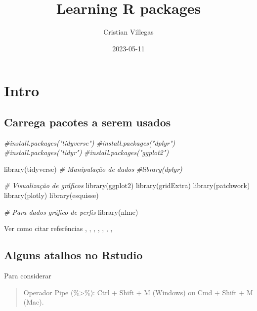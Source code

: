 \documentclass[
]{book}
\title{Learning R packages}
\author{Cristian Villegas}
\date{2023-05-11}
\newenvironment{Shaded}{\begin{snugshade}}{\end{snugshade}}
\newcommand{\CommentTok}[1]{\textcolor[rgb]{0.56,0.35,0.01}{\textit{#1}}}
\newcommand{\FunctionTok}[1]{\textcolor[rgb]{0.00,0.00,0.00}{#1}}
\newcommand{\NormalTok}[1]{#1}
\begin{document}
\maketitle

{
\setcounter{tocdepth}{1}
\tableofcontents
}
\hypertarget{intro}{%
\chapter{Intro}\label{intro}}

\hypertarget{carrega-pacotes-a-serem-usados}{%
\section{Carrega pacotes a serem usados}\label{carrega-pacotes-a-serem-usados}}

\begin{Shaded}
\begin{Highlighting}[]
\CommentTok{\#install.packages("tidyverse") }
\CommentTok{\#install.packages("dplyr")     }
\CommentTok{\#install.packages("tidyr")     }
\CommentTok{\#install.packages("ggplot2")   }

\FunctionTok{library}\NormalTok{(tidyverse)}
\CommentTok{\# Manipulação de dados}
\CommentTok{\#library(dplyr)}

\CommentTok{\# Visualização de gráficos}
\FunctionTok{library}\NormalTok{(ggplot2)}
\FunctionTok{library}\NormalTok{(gridExtra)}
\FunctionTok{library}\NormalTok{(patchwork)}
\FunctionTok{library}\NormalTok{(plotly)}
\FunctionTok{library}\NormalTok{(esquisse)}

\CommentTok{\# Para dados gráfico de perfis}
\FunctionTok{library}\NormalTok{(nlme)}
\end{Highlighting}
\end{Shaded}

Ver como citar referências \citet{tidyverse2019}, \citet{R-tidyverse}, \citet{R-tidyr}, \citet{R-ggplot2}, \citet{R-purrr}, \citet{R-dplyr}, \citet{R-knitr}, \citet{R-bookdown}

\hypertarget{alguns-atalhos-no-rstudio}{%
\section{Alguns atalhos no Rstudio}\label{alguns-atalhos-no-rstudio}}

Para considerar

\begin{quote}
Operador Pipe (\%\textgreater\%): Ctrl + Shift + M (Windows) ou Cmd + Shift + M (Mac).
\end{quote}
\end{document}
